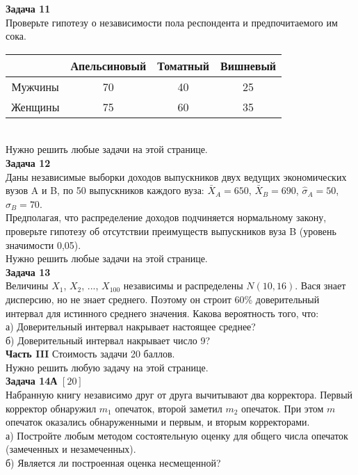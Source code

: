 \documentclass[pdftex,12pt,a4paper]{article}
\begin{document}
\textbf{Задача 11} \\
Проверьте гипотезу о независимости пола респондента и предпочитаемого им сока. \\
\begin{tabular}{|c|c|c|c|}
  \hline
   & Апельсиновый & Томатный & Вишневый  \\
  \hline
  Мужчины & 70 & 40 & 25  \\
  Женщины & 75 & 60 & 35  \\
  \hline
\end{tabular} \\

Нужно решить любые \textbf{} задачи на этой странице. \\

\textbf{Задача 12} \\
Даны независимые выборки доходов выпускников двух ведущих экономических вузов A и B, по 50 выпускников каждого вуза: $\bar{X}_{A}=650$, $\bar{X}_{B}=690$, $\hat{\sigma}_{A}=50$, $\hat{\sigma}_{B}=70$. \\ Предполагая, что распределение доходов подчиняется нормальному закону, проверьте гипотезу об отсутствии преимуществ выпускников вуза B (уровень значимости 0,05). \\

Нужно решить любые \textbf{} задачи на этой странице. \\

\textbf{Задача 13} \\
Величины $X_{1}$, $X_{2}$, ..., $X_{100}$ независимы и распределены $N(10,16)$. Вася знает дисперсию, но не знает среднего. Поэтому он строит 60\% доверительный интервал для истинного среднего значения. Какова вероятность того, что:\\
а) Доверительный интервал накрывает настоящее среднее? \\
б) Доверительный интервал накрывает число 9? \\


\newpage
\textbf{Часть III} Стоимость задачи 20 баллов. \\

Нужно решить любую \textbf{} задачу на этой странице. \\


\textbf{Задача 14А} $[20]$ \\
Набранную книгу независимо друг от друга вычитывают два корректора. Первый корректор обнаружил $m_{1}$ опечаток, второй заметил $m_{2}$ опечаток. При этом $m$ опечаток оказались обнаруженными и первым, и вторым корректорами. \\
а) Постройте любым методом состоятельную оценку для общего числа опечаток (замеченных и незамеченных). \\
б) Является ли построенная оценка несмещенной? \\
\end{document}
